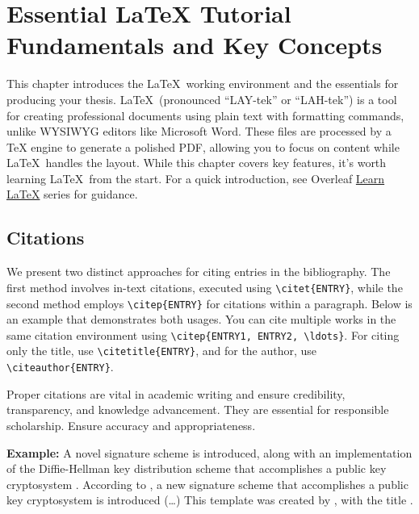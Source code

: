 \chapter[Essential LaTeX Tutorial: Fundamentals and Key Concepts]{Essential LaTeX Tutorial Fundamentals and Key Concepts}
\label{cp:latex-tutorial}

This chapter introduces the \LaTeX~working environment and the essentials for producing your thesis. \LaTeX~(pronounced ``LAY-tek'' or ``LAH-tek'') is a tool for creating professional documents using plain text with formatting commands, unlike WYSIWYG editors like Microsoft Word. These files are processed by a TeX engine to generate a polished PDF, allowing you to focus on content while \LaTeX~handles the layout. While this chapter covers key features, it's worth learning \LaTeX~from the start. For a quick introduction, see Overleaf \href{https://www.overleaf.com/learn/latex/Learn_LaTeX_in_30_minutes}{Learn LaTeX} series for guidance.

\section{Citations}
\label{sec:citations}
We present two distinct approaches for citing entries in the bibliography. The first method involves in-text citations, executed using \verb|\citet{ENTRY}|, while the second method employs \verb|\citep{ENTRY}| for citations within a paragraph. Below is an example that demonstrates both usages. You can cite multiple works in the same citation environment using \verb|\citep{ENTRY1, ENTRY2, \ldots}|. For citing only the title, use \verb|\citetitle{ENTRY}|, and for the author, use \verb|\citeauthor{ENTRY}|.

\begin{block}[tip]
    Proper citations are vital in academic writing and ensure credibility, transparency, and knowledge advancement. They are essential for responsible scholarship. Ensure accuracy and appropriateness.
\end{block}

\noindent\textbf{Example:} A novel signature scheme is introduced, along with an implementation of the Diffie-Hellman key distribution scheme that accomplishes a public key cryptosystem \citep{Elgamal1985}. According to \citet{Elgamal1985}, a new signature scheme that accomplishes a public key cryptosystem is introduced (\ldots) This template was created by \citeauthor{IPLeiriaThesis}, with the title .

